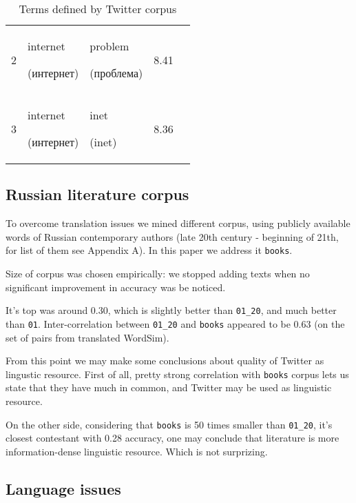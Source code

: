 \documentclass[11pt,letterpaper]{article}
\begin{document}
\begin{table*}[t]
\begin{center}
\begin{tabular}{|l|ll|r|r|}
2 & internet  \begin{russian}(интернет)\end{russian} & problem \begin{russian}(проблема)\end{russian} & 8.41 \\
3 & internet  \begin{russian}(интернет)\end{russian} & inet \begin{russian}(inet)\end{russian} & 8.36 \\
\hline
\end{tabular}
\end{center}
\caption{\label{discovered-table} Terms defined by Twitter corpus }
\end{table*}

\subsection{Russian literature corpus}

To overcome translation issues we mined different corpus, using publicly 
available words of Russian contemporary authors (late 20th century - beginning
of 21th, for list of them see Appendix A). In this paper we address it 
{\tt books}.

Size of corpus was chosen empirically: we stopped adding texts when 
no significant improvement in accuracy was be noticed.

It's top was around 0.30, which is slightly better than {\tt 01\_20}, 
and much better than {\tt 01}. Inter-correlation between {\tt 01\_20} 
and {\tt books} appeared to be 0.63 (on the set of pairs
from translated WordSim).

From this point we may make some conclusions about quality of 
Twitter as lingustic resource. First of all, pretty strong correlation
with {\tt books} corpus lets us state that they have much in common, and
Twitter may be used as linguistic resource. 

On the other side, considering that {\tt books} is 50
times smaller than {\tt 01\_20}, it's closest contestant with 0.28 accuracy, 
one may conclude that literature is more information-dense linguistic resource.
Which is not surprizing.


\subsection{Language issues}
\end{document}
